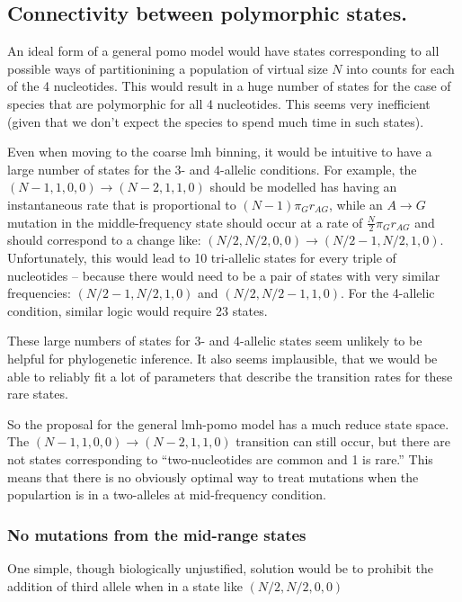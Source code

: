 \documentclass{llncs}
\begin{document}
\subsection*{Connectivity between polymorphic states.}
An ideal form of a general pomo model would have states corresponding to all possible ways of partitionining
    a population of virtual size $N$ into counts for each of the 4 nucleotides.
This would result in a huge number of states for the case of species that are polymorphic for all 4 nucleotides.
This seems very inefficient (given that we don't expect the species to spend much time in such states).

Even when moving to the coarse lmh binning, it would be intuitive to have a large number of states
    for the 3- and 4-allelic conditions.
For example, the $(N-1,1, 0,0) \rightarrow (N-2,1,1,0)$ should be modelled has having an instantaneous rate that
    is proportional to $(N-1)\pi_G r_{AG}$, while an $A\rightarrow G$ mutation in the middle-frequency state
    should occur at a rate of $\frac{N}{2}\pi_G r_{AG}$ and should correspond to a change like:
    $(N/2,N/2, 0,0) \rightarrow (N/2 - 1,N/2,1,0)$.
Unfortunately, this would lead to 10 tri-allelic states for every triple of nucleotides -- because there would need to be 
    a pair of states with very similar frequencies: $(N/2-1,N/2,1,0)$ and $(N/2,N/2 - 1,1,0)$.
For the 4-allelic condition, similar logic would require 23 states.

These large numbers of states for 3- and 4-allelic states seem unlikely to be helpful for phylogenetic inference.
It also seems implausible, that we would be able to reliably fit a lot of parameters that describe the transition 
    rates for these rare states.

So the proposal for the general lmh-pomo model has a much reduce state space.
The $(N-1,1, 0,0) \rightarrow (N-2,1,1,0)$ transition can still occur, but there are not states corresponding to 
``two-nucleotides are common and 1 is rare.''
This means that there is no obviously optimal way to treat mutations when the populartion is in a two-alleles at mid-frequency
    condition.

\subsubsection*{No mutations from the mid-range states}
One simple, though biologically unjustified, solution would be to prohibit the addition of third allele when in a state like $(N/2, N/2, 0, 0)$
\end{document}
